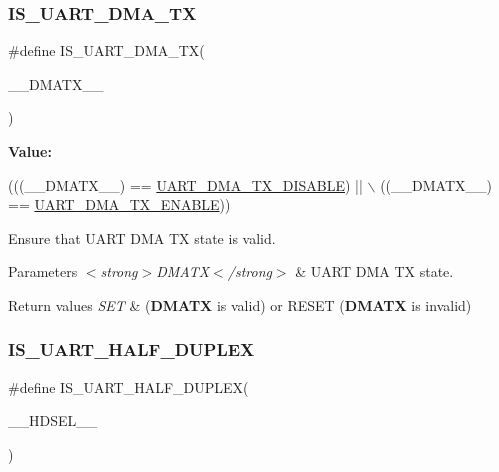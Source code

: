 \subsubsection{\texorpdfstring{I\+S\+\_\+\+U\+A\+R\+T\+\_\+\+D\+M\+A\+\_\+\+TX}{IS\_UART\_DMA\_TX}}
{\footnotesize\ttfamily \#define I\+S\+\_\+\+U\+A\+R\+T\+\_\+\+D\+M\+A\+\_\+\+TX(\begin{DoxyParamCaption}\item[{}]{\+\_\+\+\_\+\+D\+M\+A\+T\+X\+\_\+\+\_\+ }\end{DoxyParamCaption})}

{\bfseries Value\+:}
\begin{DoxyCode}
(((\_\_DMATX\_\_) == \hyperlink{group___u_a_r_t___d_m_a___tx_gaa318cc9c1aa55acc5bb93f378ac7d8e4}{UART\_DMA\_TX\_DISABLE}) || \(\backslash\)
                                       ((\_\_DMATX\_\_) == \hyperlink{group___u_a_r_t___d_m_a___tx_gab1c3e8113617fb9c8fc63b3f3d7c8c65}{UART\_DMA\_TX\_ENABLE}))
\end{DoxyCode}


Ensure that U\+A\+RT D\+MA TX state is valid. 


\begin{DoxyParams}{Parameters}
{\em $<$strong$>$\+D\+M\+A\+T\+X$<$/strong$>$} & U\+A\+RT D\+MA TX state. \\
\hline
\end{DoxyParams}

\begin{DoxyRetVals}{Return values}
{\em S\+ET} & ({\bfseries D\+M\+A\+TX} is valid) or R\+E\+S\+ET ({\bfseries D\+M\+A\+TX} is invalid) \\
\hline
\end{DoxyRetVals}
\mbox{\label{group___u_a_r_t___private___macros_ga2298a324be00d275d98b336569ee3f97}} 
\subsubsection{\texorpdfstring{I\+S\+\_\+\+U\+A\+R\+T\+\_\+\+H\+A\+L\+F\+\_\+\+D\+U\+P\+L\+EX}{IS\_UART\_HALF\_DUPLEX}}
{\footnotesize\ttfamily \#define I\+S\+\_\+\+U\+A\+R\+T\+\_\+\+H\+A\+L\+F\+\_\+\+D\+U\+P\+L\+EX(\begin{DoxyParamCaption}\item[{}]{\+\_\+\+\_\+\+H\+D\+S\+E\+L\+\_\+\+\_\+ }\end{DoxyParamCaption})}

